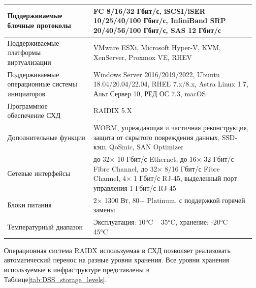 \documentclass[14pt, a4paper]{extarticle}
\begin{document}
\begin{tabularx}{\textwidth}{|l|X|}
  Поддерживаемые блочные протоколы                & FC 8/16/32 Гбит/с, iSCSI/iSER 10/25/40/100 Гбит/с, InfiniBand SRP 20/40/56/100 Гбит/с, SAS 12 Гбит/с                                                      \\\hline
  Поддерживаемые платформы виртуализации          & VMware ESXi, Microsoft Hyper-V, KVM, XenServer, Proxmox VE, RHEV                                                                                          \\\hline
  Поддерживаемые операционные системы инициаторов & Windows Server 2016/2019/2022, Ubuntu 18.04/20.04/22.04, RHEL 7.x/8.x, Astra Linux 1.7, Альт Сервер 10, РЕД ОС 7.3, macOS                                 \\\hline
  Программное обеспечение СХД                     & RAIDIX 5.X                                                                                                                                                \\\hline
  Дополнительные функции                          & WORM, упреждающая и частичная реконструкция, защита от скрытого повреждения данных, SSD-кэш, QoSmic, SAN Optimizer                                        \\\hline
  Сетевые интерфейсы                              & до 32× 10 Гбит/с Ethernet, до 16× 32 Гбит/с Fibre Channel, до 32× 8/16 Гбит/с Fibre Channel, 4× 1 Гбит/с RJ-45, выделенный порт управления 1 Гбит/с RJ-45 \\\hline
  Блоки питания                                   & 2× 1300 Вт, 80+ Platinum, с поддержкой горячей замены                                                                                                     \\\hline
  Температурный диапазон                          & Эксплуатация: 10°C ~ 35°C, хранение: -20°C ~ 45°C                                                                                                         \\\hline
\end{tabularx}

Операционная система RAIDX \cite{raidix-web} используемая в СХД позволяет реализовать
автоматический перенос на разные уровни хранения. Все уровни хранения используемые в
инфраструктуре представлены в Таблице\;\ref{tab:DSS_storage_levels}.
\end{document}
